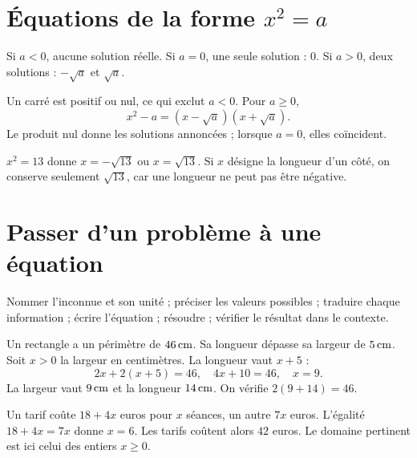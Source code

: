 \documentclass[../cours_3e.tex]{subfiles}
\begin{document}
\section{\texorpdfstring{Équations de la forme $x^2=a$}{Équations de la forme x carré = a}}
\begin{propriete}
Si $a<0$, aucune solution réelle. Si $a=0$, une seule solution : $0$. Si $a>0$, deux solutions : $-\sqrt a$ et $\sqrt a$.
\end{propriete}
\begin{demonstration}
Un carré est positif ou nul, ce qui exclut $a<0$. Pour $a\geq0$,
\[x^2-a=(x-\sqrt a)(x+\sqrt a).\]
Le produit nul donne les solutions annoncées ; lorsque $a=0$, elles coïncident.
\end{demonstration}
\begin{exemple}
$x^2=13$ donne $x=-\sqrt{13}$ ou $x=\sqrt{13}$. Si $x$ désigne la longueur d'un côté, on conserve seulement $\sqrt{13}$, car une longueur ne peut pas être négative.
\end{exemple}
\section{Passer d'un problème à une équation}
\begin{methode}
Nommer l'inconnue et son unité ; préciser les valeurs possibles ; traduire chaque information ; écrire l'équation ; résoudre ; vérifier le résultat dans le contexte.
\end{methode}
\begin{exemple}[Un rectangle]
Un rectangle a un périmètre de $46\,\mathrm{cm}$. Sa longueur dépasse sa largeur de $5\,\mathrm{cm}$. Soit $x>0$ la largeur en centimètres. La longueur vaut $x+5$ :
\[2x+2(x+5)=46,\quad4x+10=46,\quad x=9.\]
La largeur vaut $9\,\mathrm{cm}$ et la longueur $14\,\mathrm{cm}$. On vérifie $2(9+14)=46$.
\end{exemple}
\begin{exemple}
Un tarif coûte $18+4x$ euros pour $x$ séances, un autre $7x$ euros. L'égalité $18+4x=7x$ donne $x=6$. Les tarifs coûtent alors $42$ euros. Le domaine pertinent est ici celui des entiers $x\geq0$.
\end{exemple}
\end{document}
